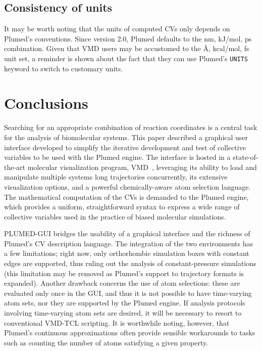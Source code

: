 \documentclass[preprint,12pt]{elsarticle}
\begin{document}
\subsection{Consistency of units}

It may be worth noting that the units of computed CVs only depends on
Plumed's conventions.  Since version 2.0, Plumed defaults to the nm,
kJ/mol, ps combination. Given that VMD users may be accustomed to the
\AA, kcal/mol, fs unit set, a reminder is shown about the fact that
they can use Plumed's \texttt{UNITS} keyword to switch to customary
units.





\section{Conclusions}

Searching for an appropriate combination of reaction coordinates is a
central task for the analysis of biomolecular systems.  This paper
described a graphical user interface developed to simplify the
iterative development and test of collective variables to be used with
the Plumed engine. The interface is hosted in a state-of-the-art
molecular visualization program,
VMD~\cite{Humphrey_Dalke_Schulten_1996}, leveraging its ability to
load and manipulate multiple systems long trajectories
concurrently, its extensive visualization options, and a powerful
chemically-aware atom selection language. The mathematical computation
of the CVs is demanded to the Plumed engine, which
provides a uniform, straightforward syntax to express a wide range of
collective variables used in the practice of biased molecular simulations.

PLUMED-GUI bridges the usability of a graphical
interface and the richness of Plumed's CV description language.
The integration of the two environments has a few
limitations; right now, only orthorhombic simulation boxes with
constant edges are supported, thus ruling out the analysis of
constant-pressure simulations (this limitation may be removed as
Plumed's support to trajectory formats is expanded). Another drawback
concerns the use of atom selections: these are evaluated only once in
the GUI, and thus it is not possible to have time-varying atom sets,
nor they are supported by the Plumed engine.  If analysis protocols
involving time-varying atom sets are desired, it will be necessary to
resort to conventional VMD-TCL scripting. It is worthwhile noting,
however, that Plumed's continuous approximations often provide
sensible workarounds to tasks such as counting the number of atoms
satisfying a given property.
\end{document}
